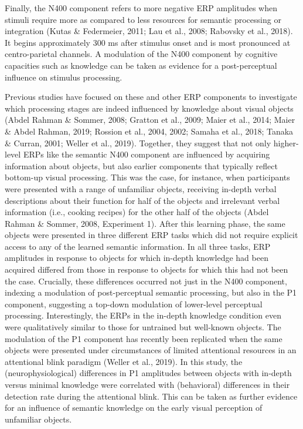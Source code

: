\documentclass[
  english,
  man,floatsintext]{apa7}
\begin{document}
Finally, the N400 component refers to more negative ERP amplitudes when stimuli require more as compared to less resources for semantic processing or integration (Kutas \& Federmeier, 2011; Lau et al., 2008; Rabovsky et al., 2018). It begins approximately 300 ms after stimulus onset and is most pronounced at centro-parietal channels. A modulation of the N400 component by cognitive capacities such as knowledge can be taken as evidence for a post-perceptual influence on stimulus processing.

Previous studies have focused on these and other ERP components to investigate which processing stages are indeed influenced by knowledge about visual objects (Abdel Rahman \& Sommer, 2008; Gratton et al., 2009; Maier et al., 2014; Maier \& Abdel Rahman, 2019; Rossion et al., 2004, 2002; Samaha et al., 2018; Tanaka \& Curran, 2001; Weller et al., 2019). Together, they suggest that not only higher-level ERPs like the semantic N400 component are influenced by acquiring information about objects, but also earlier components that typically reflect bottom-up visual processing. This was the case, for instance, when participants were presented with a range of unfamiliar objects, receiving in-depth verbal descriptions about their function for half of the objects and irrelevant verbal information (i.e., cooking recipes) for the other half of the objects (Abdel Rahman \& Sommer, 2008, Experiment 1). After this learning phase, the same objects were presented in three different ERP tasks which did not require explicit access to any of the learned semantic information. In all three tasks, ERP amplitudes in response to objects for which in-depth knowledge had been acquired differed from those in response to objects for which this had not been the case. Crucially, these differences occurred not just in the N400 component, indexing a modulation of post-perceptual semantic processing, but also in the P1 component, suggesting a top-down modulation of lower-level perceptual processing. Interestingly, the ERPs in the in-depth knowledge condition even were qualitatively similar to those for untrained but well-known objects. The modulation of the P1 component has recently been replicated when the same objects were presented under circumstances of limited attentional resources in an attentional blink paradigm (Weller et al., 2019). In this study, the (neurophysiological) differences in P1 amplitudes between objects with in-depth versus minimal knowledge were correlated with (behavioral) differences in their detection rate during the attentional blink. This can be taken as further evidence for an influence of semantic knowledge on the early visual perception of unfamiliar objects.
\end{document}

